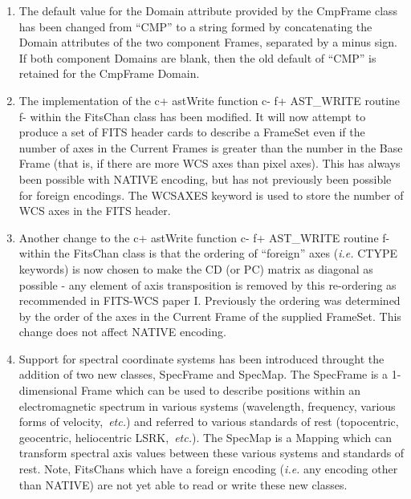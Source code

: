 \documentclass[twoside,11pt]{article}
\begin{document}
\begin{enumerate}

\item The default value for the Domain attribute provided by the CmpFrame
class has been changed from ``CMP'' to a string formed by concatenating
the Domain attributes of the two component Frames, separated by a minus
sign. If both component Domains are blank, then the old default of
``CMP'' is retained for the CmpFrame Domain.

\item The implementation of the
c+
astWrite function
c-
f+
AST\_WRITE routine
f-
within the FitsChan class has been modified. It will now attempt to
produce a set of FITS header cards to describe a FrameSet even if the
number of axes in the Current Frames is greater than the number in the
Base Frame (that is, if there are more WCS axes than pixel axes). This
has always been possible with NATIVE encoding, but has not previously
been possible for foreign encodings. The WCSAXES keyword is used to store
the number of WCS axes in the FITS header.

\item Another change to the
c+
astWrite function
c-
f+
AST\_WRITE routine
f-
within the FitsChan class is that the ordering of ``foreign'' axes
(\emph{i.e.} CTYPE keywords) is now chosen to make the CD (or PC) matrix
as diagonal as possible - any element of axis transposition is removed by
this re-ordering as recommended in FITS-WCS paper I. Previously the
ordering was determined by the order of the axes in the Current Frame of
the supplied FrameSet. This change does not affect NATIVE encoding.

\item Support for spectral coordinate systems has been introduced
throught the addition of two new classes, SpecFrame and SpecMap.
The SpecFrame is a 1-dimensional Frame which can be used to describe
positions within an electromagnetic spectrum in various systems
(wavelength, frequency, various forms of velocity,~{\em{etc.}}) and referred
to various standards of rest (topocentric, geocentric, heliocentric
LSRK,~{\em{etc.}}). The SpecMap is a Mapping which can transform spectral
axis values between these various systems and standards of rest. Note,
FitsChans which have a foreign encoding (\emph{i.e.} any encoding other
than NATIVE) are not yet able to read or write these new classes.


\end{enumerate}
\end{document}
